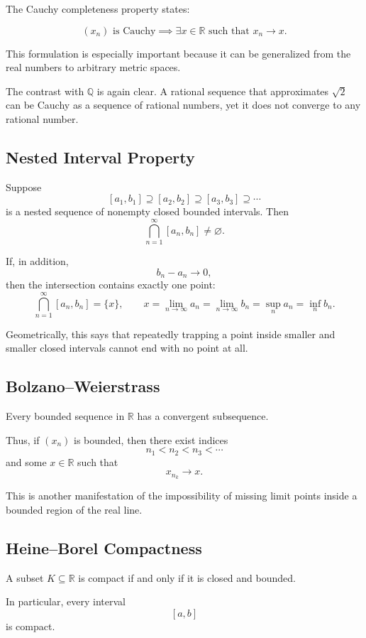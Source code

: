 \documentclass{essay}
\begin{document}
The Cauchy completeness property states:

\[
(x_n)\text{ is Cauchy}
\implies
\exists x\in\mathbb{R}
\text{ such that }
x_n\to x.
\]

This formulation is especially important because it can be generalized from the real numbers to arbitrary metric spaces.

The contrast with \(\mathbb{Q}\) is again clear. A rational sequence that approximates \(\sqrt{2}\) can be Cauchy as a sequence of rational numbers, yet it does not converge to any rational number.

\subsection{Nested Interval Property}

Suppose
\[
[a_1,b_1]\supseteq[a_2,b_2]\supseteq[a_3,b_3]\supseteq\cdots
\]
is a nested sequence of nonempty closed bounded intervals. Then
\[
\bigcap_{n=1}^{\infty}[a_n,b_n]\neq\varnothing.
\]

If, in addition,
\[
b_n-a_n\to0,
\]
then the intersection contains exactly one point:
\[
\bigcap_{n=1}^{\infty}[a_n,b_n]=\{x\},
\qquad
x=\lim_{n\to\infty}a_n=\lim_{n\to\infty}b_n=\sup_n a_n=\inf_n b_n.
\]

Geometrically, this says that repeatedly trapping a point inside smaller and smaller closed intervals cannot end with no point at all.

\subsection{Bolzano--Weierstrass}

Every bounded sequence in \(\mathbb{R}\) has a convergent subsequence.

Thus, if \((x_n)\) is bounded, then there exist indices
\[
n_1<n_2<n_3<\cdots
\]
and some \(x\in\mathbb{R}\) such that
\[
x_{n_k}\to x.
\]

This is another manifestation of the impossibility of missing limit points inside a bounded region of the real line.

\subsection{Heine--Borel Compactness}

A subset \(K\subseteq\mathbb{R}\) is compact if and only if it is closed and bounded.

In particular, every interval
\[
[a,b]
\]
is compact.
\end{document}
